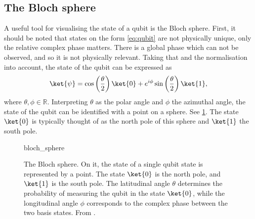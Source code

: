 \subsection{The Bloch sphere}
A useful tool for visualising the state of a qubit is the Bloch sphere.
First, it should be noted that states on the form \cref{eq:qubit} are not physically unique, only the relative complex phase matters.
There is a global phase which can not be observed, and so it is not physically relevant.
Taking that and the normalisation into account, the state of the qubit can be expressed as
\begin{equation}
    \ket{\psi} = \cos\left(\frac{\theta}{2}\right) \ket{0} + e^{i\phi} \sin\left(\frac{\theta}{2}\right) \ket{1},
    \label{eq:bloch}
\end{equation}
where $\theta, \phi \in \mathbb{R}$.
Interpreting $\theta$ as the polar angle and $\phi$ the azimuthal angle, the state of the qubit can be identified with a point on a sphere.
See \cref{fig:bloch}.
The state $\ket{0}$ is typically thought of as the north pole of this sphere and $\ket{1}$ the south pole.

\begin{figure}
    \centering
    \def\svgwidth{0.5\textwidth}
    {bloch_sphere}
    \caption{
        The Bloch sphere.
        On it, the state of a single qubit state is represented by a point.
        The state $\ket{0}$ is the north pole, and $\ket{1}$ is the south pole.
        The latitudinal angle $\theta$ determines the probability of measuring the qubit in the state $\ket{0}$, while the longitudinal angle $\phi$ corresponds to the complex phase between the two basis states.
        From \cite{wikipedia_bloch}.
    }
    \label{fig:bloch}
\end{figure}

